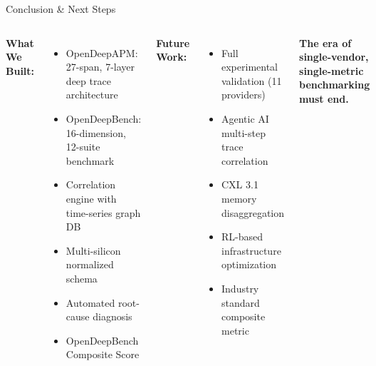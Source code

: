 \documentclass[aspectratio=169,10pt]{beamer}
\begin{document}
\begin{frame}{Conclusion \& Next Steps}
\begin{columns}[T]
\textbf{What We Built:}
\begin{itemize}\small
\item OpenDeepAPM: 27-span, 7-layer deep trace architecture
\item OpenDeepBench: 16-dimension, 12-suite benchmark
\item Correlation engine with time-series graph DB
\item Multi-silicon normalized schema
\item Automated root-cause diagnosis
\item OpenDeepBench Composite Score
\end{itemize}

\textbf{Future Work:}
\begin{itemize}\small
\item Full experimental validation (11 providers)
\item Agentic AI multi-step trace correlation
\item CXL 3.1 memory disaggregation
\item RL-based infrastructure optimization
\item Industry standard composite metric
\end{itemize}
\vspace{0.5em}
\textcolor{t1}{\textbf{The era of single-vendor, single-metric benchmarking must end.}}
\end{columns}
\end{frame}
\end{document}
